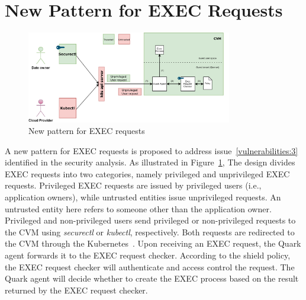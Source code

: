 \section{New Pattern for EXEC Requests}
\label{sec:design_EXEC_Requests}
\begin{figure}[!htb]
    \centering
    \includegraphics[width=0.8\textwidth]{images/new_pattern_of_exec.png}
    \caption[New pattern for EXEC requests]{New pattern for EXEC requests}
    \label{fig:new_pattern_of_exec}
\end{figure}


A new pattern for EXEC requests is proposed to address issue~\ref{vulnerabilities:3} identified in the security analysis. As illustrated in Figure~\ref{fig:new_pattern_of_exec}, The design divides EXEC requests into two categories, namely privileged and unprivileged EXEC requests. 
Privileged EXEC requests are issued by privileged users (i.e., application owners), while untrusted entities issue unprivileged requests. An untrusted entity here refers to someone other than the application owner. Privileged and non-privileged users send privileged or non-privileged requests to the \acrshort{CVM} using \emph{securectl} or \emph{kubectl}, 
respectively. Both requests are redirected to the \acrshort{CVM} through the Kubernetes~\cite*{k8s}. Upon receiving an EXEC request, the Quark agent forwards it to the EXEC request checker. According to the shield policy, the EXEC request checker will authenticate and access control the request. The Quark agent will decide whether to create the 
EXEC process based on the result returned by the EXEC request checker.


